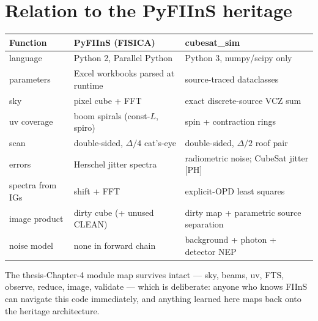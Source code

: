 \documentclass[11pt]{article}
\begin{document}
\section{Relation to the PyFIInS heritage}

\begin{center}\small
\begin{tabular}{@{}p{4.2cm}p{4.4cm}p{4.6cm}@{}}
\toprule
\textbf{Function} & \textbf{PyFIInS (FISICA)} & \textbf{cubesat\_sim}\\
\midrule
language & Python 2, Parallel Python & Python 3, numpy/scipy only\\
parameters & Excel workbooks parsed at runtime & source-traced dataclasses\\
sky & pixel cube + FFT & exact discrete-source VCZ sum\\
uv coverage & boom spirals (const-$L$, spiro) & spin + contraction rings\\
scan & double-sided, $\Delta/4$ cat's-eye & double-sided, $\Delta/2$ roof pair\\
errors & Herschel jitter spectra & radiometric noise; CubeSat jitter [PH]\\
spectra from IGs & shift + FFT & explicit-OPD least squares\\
image product & dirty cube (+ unused CLEAN) & dirty map + parametric
source separation\\
noise model & none in forward chain & background + photon + detector NEP\\
\bottomrule
\end{tabular}
\end{center}

The thesis-Chapter-4 module map survives intact --- sky, beams, uv,
FTS, observe, reduce, image, validate --- which is deliberate: anyone who
knows FIInS can navigate this code immediately, and anything learned here
maps back onto the heritage architecture.
\end{document}
